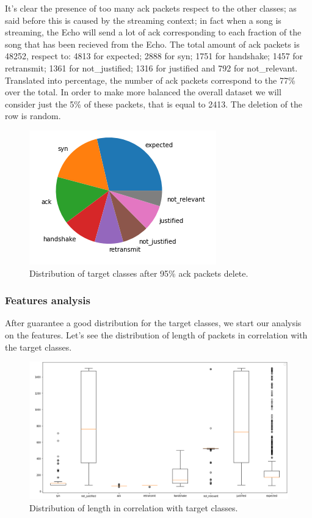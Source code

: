 \documentclass[sigconf]{acmart}
\begin{document}
    It's clear the presence of too many ack packets respect to the other classes; as said before this is caused by the streaming context; in fact when a song is streaming, the Echo will send a lot of ack corresponding to each fraction of the song that has been recieved from the Echo. The total amount of ack packets is 48252, respect to: 4813 for expected; 2888 for syn; 1751 for handshake; 1457 for retransmit; 1361 for not\_justified; 1316 for justified and 792 for not\_relevant. Translated into percentage, the number of ack packets correspond to the 77\% over the total. In order to make more balanced the overall dataset we will consider just the 5\% of these packets, that is equal to 2413. The deletion of the row is random.
    \begin{figure}[h!]
        \includegraphics[width=0.8\linewidth]{img/target_class_distribution_after_del.png}
        \caption{Distribution of target classes after 95\% ack packets delete.}
        \label{fig:target_class_distribution_after_del}
    \end{figure}

    \subsubsection{Features analysis}
    After guarantee a good distribution for the target classes, we start our analysis on the features. Let's see the distribution of length of packets in correlation with the target classes.
    \begin{figure}[h!]
        \includegraphics[width=0.8\linewidth]{img/length_distribution.png}
        \caption{Distribution of length in correlation with target classes.}
        \label{fig:length_distribution}
    \end{figure}
\end{document}
